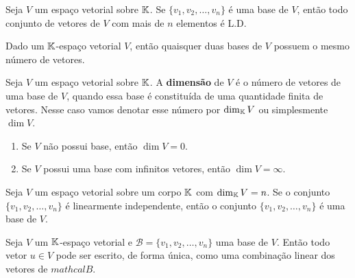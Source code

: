 \documentclass{beamer}
\begin{document}
\begin{frame}
  \begin{teorema}
    Seja $V$ um espaço vetorial sobre $\mathbb{K}$. \pause Se $\{v_1, v_2, \dots, v_n\}$ é uma base de $V$, \pause então todo conjunto de vetores de $V$ \pause com mais de $n$ elementos \pause é L.D.\pause 
  \end{teorema}

  \begin{corolario}
    Dado um $\mathbb{K}$-espaço vetorial $V$, \pause então quaisquer duas bases de $V$ possuem o mesmo número de vetores.
  \end{corolario}
\end{frame}

\begin{frame}
  \begin{definicao}
    Seja $V$ um espaço vetorial sobre $\mathbb{K}$. \pause A \textbf{dimensão} de $V$ \pause é o número de vetores de uma base de $V$, \pause quando essa base é constituída de uma quantidade finita de vetores.\pause 
    Nesse caso vamos denotar esse número por $\dim_{\mathbb{K}}V$ \pause ou simplesmente $\dim V$.\pause 
  \end{definicao}

  \begin{observacoes}
    \begin{enumerate}[label={\roman*})]
      \item Se $V$ não possui base, \pause então $\dim V = 0$.\pause 

      \item Se $V$ possui uma base com infinitos vetores, \pause então $\dim V = \infty$.
    \end{enumerate}
  \end{observacoes}
\end{frame}

\begin{frame}
  \begin{teorema}
    Seja $V$ um espaço vetorial sobre um corpo $\mathbb{K}$ \pause com $\dim_{\mathbb{K}}V = n$. \pause Se o conjunto $\{v_1, v_2, \dots, v_n\}$ \pause é linearmente independente, \pause então o conjunto $\{v_1, v_2, \dots, v_n\}$ é uma base de $V$.
  \end{teorema}
\end{frame}

\begin{frame}
  \begin{teorema}
    Seja $V$ um $\mathbb{K}$-espaço vetorial \pause e $\mathcal{B} = \{v_1, v_2, \dots, v_n\}$ uma base de $V$. \pause Então todo vetor $u \in V$ \pause pode ser escrito, de forma única, \pause como uma combinação linear dos vetores de $mathcal{B}$.
  \end{teorema}
\end{frame}
\end{document}
